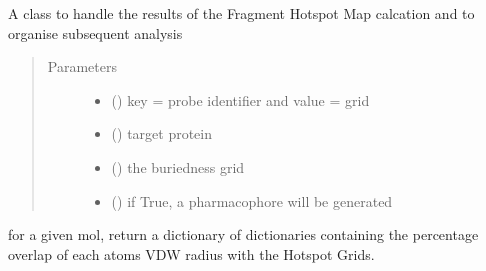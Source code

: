 \documentclass[letterpaper,10pt,english]{sphinxmanual}
\begin{document}
\begin{fulllineitems}
\label{\detokenize{result_api:hotspots.result.Results}}
A class to handle the results of the Fragment Hotspot Map calcation and to organise subsequent analysis
\begin{quote}\begin{description}
\item[{Parameters}] \leavevmode\begin{itemize}
\item {} 
 () \textendash{} key = probe identifier and value = grid

\item {} 
 () \textendash{} target protein

\item {} 
 () \textendash{} the buriedness grid

\item {} 
 () \textendash{} if True, a pharmacophore will be generated

\end{itemize}

\end{description}\end{quote}

\begin{fulllineitems}
\label{\detokenize{result_api:hotspots.result.Results.atomic_volume_overlap}}
for a given mol, return a dictionary of dictionaries containing the percentage overlap of each atoms
VDW radius with the Hotspot Grids.


\end{fulllineitems}
\end{fulllineitems}
\end{document}
